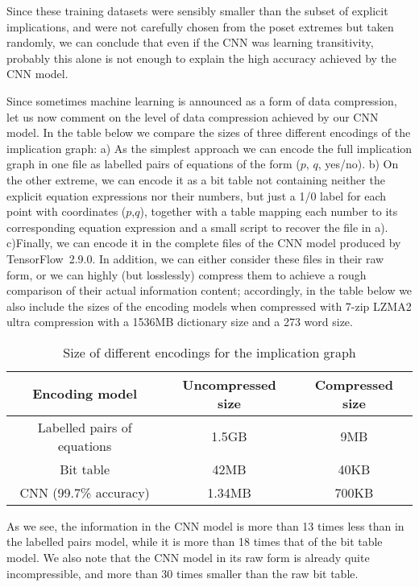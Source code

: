 \noindent Since these training datasets were sensibly smaller than the subset of explicit implications, and were not carefully chosen from the poset extremes but taken randomly, we can conclude that even if the CNN was learning transitivity, probably this alone is not enough to explain the high accuracy achieved by the CNN model.

\smallskip

Since sometimes machine learning is announced as a form of data compression, let us now comment on the level of data compression achieved by our CNN model. In the table below we compare the sizes of three different encodings of the implication graph: a) As the simplest approach we can encode the full implication graph in one file as labelled pairs of equations of the form ($p$, $q$, yes/no). b) On the other extreme, we can encode it as a bit table not containing neither the explicit equation expressions nor their numbers, but just a 1/0 label for each point with coordinates ($p$,$q$), together with a table mapping each number to its corresponding equation expression and a small script to recover the file in a). c)Finally, we can encode it in the complete files of the CNN model produced by TensorFlow 2.9.0\cite{tensorflow2015-whitepaper}. In addition, we can either consider these files in their raw form, or we can highly (but losslessly) compress them to achieve a rough comparison of their actual information content; accordingly, in the table below we also include the sizes of the encoding models when compressed with 7-zip LZMA2 ultra compression with a 1536MB dictionary size and a 273 word size.

\begin{table}[h]
\centering
\begin{tabular}{|c|c|c|}
  \hline
  \textbf{Encoding model} & \textbf{Uncompressed size} & \textbf{Compressed size} \\\hline\hline
  Labelled pairs of equations & 1.5GB & 9MB \\\hline
  Bit table & 42MB & 40KB \\\hline
  CNN (99.7\% accuracy) & 1.34MB & 700KB \\
  \hline
\end{tabular}
\caption{Size of different encodings for the implication graph}
\end{table}

\smallskip

\noindent As we see, the information in the CNN model is more than 13 times less than in the labelled pairs model, while it is more than 18 times that of the bit table model. We also note that the CNN model in its raw form is already quite incompressible, and more than 30 times smaller than the raw bit table.

